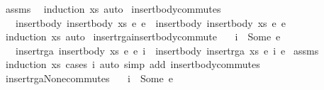 \begin{isabellebody}
%
\isadelimproof
%
\endisadelimproof
%
\isatagproof
{}\isamarkupfalse%
\ assms\ \isamarkupfalse%
\ {\isacharparenleft}induction\ xs{\isacharcomma}\ auto{\isacharparenright}%
\endisatagproof
{\isafoldproof}%
%
\isadelimproof
\isanewline
%
\endisadelimproof
\isanewline
{}\isamarkupfalse%
\ insert{\isacharunderscore}body{\isacharunderscore}commutes{\isacharcolon}\isanewline
\ \ \ {\isachardoublequoteopen}insert{\isacharunderscore}body\ {\isacharparenleft}insert{\isacharunderscore}body\ xs\ e{}{\isacharparenright}\ e{}\ {\isacharequal}\ insert{\isacharunderscore}body\ {\isacharparenleft}insert{\isacharunderscore}body\ xs\ e{}{\isacharparenright}\ e{}{\isachardoublequoteclose}\isanewline
%
\isadelimproof
%
\endisadelimproof
%
\isatagproof
{}\isamarkupfalse%
\ {\isacharparenleft}induction\ xs{\isacharcomma}\ auto{\isacharparenright}%
\endisatagproof
{\isafoldproof}%
%
\isadelimproof
\isanewline
%
\endisadelimproof
\isanewline
{}\isamarkupfalse%
\ insert{\isacharunderscore}rga{\isacharunderscore}insert{\isacharunderscore}body{\isacharunderscore}commute{\isacharcolon}\isanewline
\ \ \ {\isachardoublequoteopen}i{}\ {\isasymnoteq}\ Some\ e{}{\isachardoublequoteclose}\isanewline
\ \ \ {\isachardoublequoteopen}insert{\isacharunderscore}rga\ {\isacharparenleft}insert{\isacharunderscore}body\ xs\ e{}{\isacharparenright}\ {\isacharparenleft}e{}{\isacharcomma}\ i{}{\isacharparenright}\ {\isacharequal}\ insert{\isacharunderscore}body\ {\isacharparenleft}insert{\isacharunderscore}rga\ xs\ {\isacharparenleft}e{}{\isacharcomma}\ i{}{\isacharparenright}{\isacharparenright}\ e{}{\isachardoublequoteclose}\isanewline
%
\isadelimproof
%
\endisadelimproof
%
\isatagproof
{}\isamarkupfalse%
\ assms\ \isamarkupfalse%
\ {\isacharparenleft}induction\ xs{\isacharsemicolon}\ cases\ i{}{\isacharparenright}\ {\isacharparenleft}auto\ simp\ add{\isacharcolon}\ insert{\isacharunderscore}body{\isacharunderscore}commutes{\isacharparenright}%
\endisatagproof
{\isafoldproof}%
%
\isadelimproof
\isanewline
%
\endisadelimproof
\isanewline
{}\isamarkupfalse%
\ insert{\isacharunderscore}rga{\isacharunderscore}None{\isacharunderscore}commutes{\isacharcolon}\isanewline
\ \ \ {\isachardoublequoteopen}i{}\ {\isasymnoteq}\ Some\ e{}{\isachardoublequoteclose}\isanewline

\end{isabellebody}
